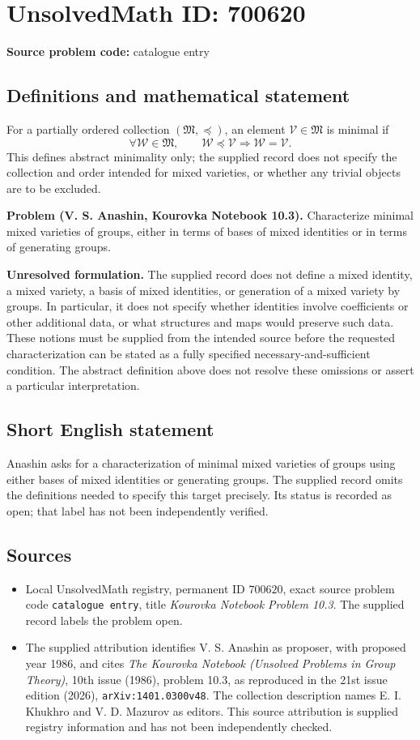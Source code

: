 \documentclass[11pt]{article}
\begin{document}
\section*{UnsolvedMath ID: 700620}
\textbf{Source problem code:} catalogue entry
\subsection{Definitions and mathematical statement}
For a partially ordered collection \((\mathfrak M,\preceq)\), an element \(\mathcal V\in\mathfrak M\) is minimal if
\[
\forall\mathcal W\in\mathfrak M,\qquad
\mathcal W\preceq\mathcal V\Longrightarrow\mathcal W=\mathcal V.
\]
This defines abstract minimality only; the supplied record does not specify the collection and order intended for mixed varieties, or whether any trivial objects are to be excluded.

\textbf{Problem (V. S. Anashin, Kourovka Notebook 10.3).} Characterize minimal mixed varieties of groups, either in terms of bases of mixed identities or in terms of generating groups.

\textbf{Unresolved formulation.} The supplied record does not define a mixed identity, a mixed variety, a basis of mixed identities, or generation of a mixed variety by groups. In particular, it does not specify whether identities involve coefficients or other additional data, or what structures and maps would preserve such data. These notions must be supplied from the intended source before the requested characterization can be stated as a fully specified necessary-and-sufficient condition. The abstract definition above does not resolve these omissions or assert a particular interpretation.
\subsection{Short English statement}
Anashin asks for a characterization of minimal mixed varieties of groups using either bases of mixed identities or generating groups. The supplied record omits the definitions needed to specify this target precisely. Its status is recorded as open; that label has not been independently verified.
\subsection{Sources}
\begin{itemize}
\item Local UnsolvedMath registry, permanent ID \(700620\), exact source problem code \texttt{catalogue entry}, title \emph{Kourovka Notebook Problem 10.3}. The supplied record labels the problem open.
\item The supplied attribution identifies V. S. Anashin as proposer, with proposed year 1986, and cites \emph{The Kourovka Notebook (Unsolved Problems in Group Theory)}, 10th issue (1986), problem 10.3, as reproduced in the 21st issue edition (2026), \texttt{arXiv:1401.0300v48}. The collection description names E. I. Khukhro and V. D. Mazurov as editors. This source attribution is supplied registry information and has not been independently checked.
\end{itemize}
\end{document}
